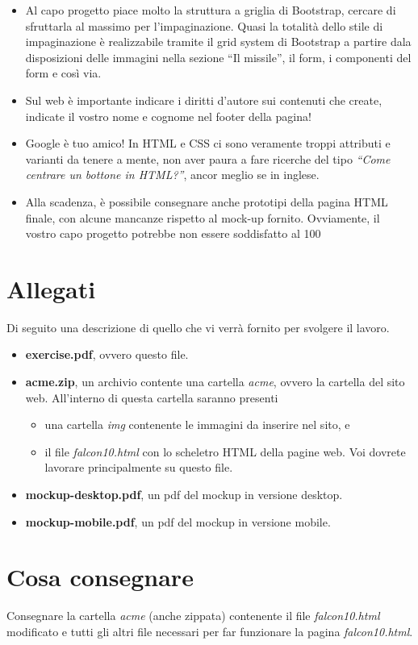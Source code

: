 \documentclass[addpoints,12pt,answers]{exam}
\begin{document}
\begin{itemize}
        \item Al capo progetto piace molto la struttura a griglia di Bootstrap, cercare di sfruttarla al massimo per l'impaginazione. Quasi la totalità dello stile di impaginazione è realizzabile tramite il grid system di Bootstrap a partire dala disposizioni delle immagini nella sezione ``Il missile'', il form, i componenti del form e così via.

        \item Sul web è importante indicare i diritti d'autore sui contenuti che create, indicate il vostro nome e cognome nel footer della pagina!

        \item Google è tuo amico! In HTML e CSS ci sono veramente troppi attributi e varianti da tenere a mente, non aver paura a fare ricerche del tipo \emph{``Come centrare un bottone in HTML?''}, ancor meglio se in inglese.

        \item Alla scadenza, è possibile consegnare anche prototipi della pagina HTML finale, con alcune mancanze rispetto al mock-up fornito. Ovviamente, il vostro capo progetto potrebbe non essere soddisfatto al 100%

    \end{itemize}

    \section{Allegati}

    Di seguito una descrizione di quello che vi verrà fornito per svolgere il lavoro.
    \begin{itemize}
        \item \textbf{exercise.pdf}, ovvero questo file.
        \item \textbf{acme.zip}, un archivio contente una cartella \emph{acme}, ovvero la cartella del sito web. All'interno di questa cartella saranno presenti
        \begin{itemize}
            \item una cartella \emph{img} contenente le immagini da inserire nel sito, e 
            \item il file \emph{falcon10.html} con lo scheletro HTML della pagine web. Voi dovrete lavorare principalmente su questo file.
        \end{itemize} 
        \item \textbf{mockup-desktop.pdf}, un pdf del mockup in versione desktop.
        \item \textbf{mockup-mobile.pdf}, un pdf del mockup in versione mobile.
    \end{itemize}

    \section{Cosa consegnare}

    Consegnare la cartella \emph{acme} (anche zippata) contenente il file \emph{falcon10.html} modificato e tutti gli altri file necessari per far funzionare la pagina \emph{falcon10.html}.
\end{document}
